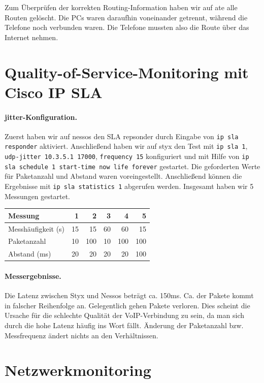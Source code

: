 \documentclass[a4paper,10pt]{scrartcl}
\begin{document}
Zum Überprüfen der korrekten Routing-Information haben wir auf ate alle Routen gelöscht. Die PCs waren daraufhin voneinander getrennt, während die Telefone noch verbunden waren. Die Telefone mussten also die Route über das Internet nehmen.

\section{Quality-of-Service-Monitoring mit Cisco IP SLA}

\paragraph*{jitter-Konfiguration.} Zuerst haben wir auf nessos den SLA repsonder durch Eingabe von \texttt{ip sla responder} aktiviert. Anschließend haben wir auf styx den Test mit \texttt{ip sla 1}, \texttt{udp-jitter 10.3.5.1 17000}, \texttt{frequency 15} konfiguriert und mit Hilfe von \texttt{ip sla schedule 1 start-time now life forever} gestartet. Die geforderten Werte für Paketanzahl und Abstand waren voreingestellt. Anschließend können die Ergebnisse mit \texttt{ip sla statistics 1} abgerufen werden. Insgesamt haben wir 5 Messungen gestartet.

\begin{center}
  \begin{tabular}{l|rrrrr}
  Messung & 1 & 2 & 3 & 4 & 5 \\ \hline
  Messhäufigkeit (s) & 15 & 15 & 60 & 60 & 15 \\
  Paketanzahl        & 10 &100 & 10 &100 &100 \\
  Abstand (ms)       & 20 & 20 & 20 & 20 &100
  \end{tabular}
\end{center}


\paragraph*{Messergebnisse.} Die Latenz zwischen Styx und Nessos beträgt ca. 150ms. Ca. der Pakete kommt in falscher Reihenfolge an. Gelegentlich gehen Pakete verloren. Dies scheint die Ursache für die schlechte Qualität der VoIP-Verbindung zu sein, da man sich durch die hohe Latenz häufig ins Wort fällt. Änderung der Paketanzahl bzw. Messfrequenz ändert nichts an den Verhältnissen.

\section{Netzwerkmonitoring}
\end{document}
